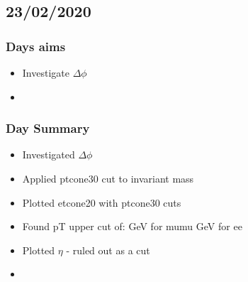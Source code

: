 \subsection*{\textbf{23/02/2020}}

\subsubsection*{Days aims}
\begin{itemize}
    \item Investigate $\Delta \phi$
    \item 
\end{itemize}

\subsubsection*{Day Summary}
\begin{itemize}
    \item Investigated $\Delta \phi$
    \item Applied ptcone30 cut to invariant mass
    \item Plotted etcone20 with ptcone30 cuts
    
    \item Found pT upper cut of:
     GeV for mumu 
     GeV for ee 
    
    \item Plotted $\eta$ - ruled out as a cut
    
    \item 
\end{itemize}
